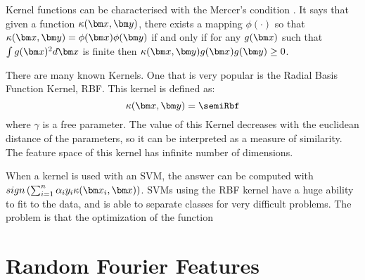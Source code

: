 \begin{pre-delivery}
Kernel functions can be characterised with the Mercer's condition
\cite{mercer1909functions}. It says that given a function $\kernel(\vx, \vy)$,
there exists a mapping $\phi(\cdot)$ so that
$\kernel(\vx, \vy) = \phi(\vx)\phi(\vy)$
if and only if for any $g(\vx)$ such that $\int g(\vx)^2 d\vx$ is finite then
$\kernel(\vx, \vy)g(\vx)g(\vy) \geq 0$.

There are many known Kernels. One that is very popular is the Radial Basis
Function Kernel, RBF. This kernel is defined as:
\begin{equation}
\kernel(\vx,\vy) = \semiRbf
\end{equation}
where $\gamma$ is a free parameter. The value of this Kernel decreases with the
euclidean distance of the parameters, so it can be interpreted as a measure
of similarity. The feature space of this kernel has infinite number of
dimensions.

When a kernel is used with an SVM, the answer can be computed with
$sign\left(\sum_{i = 1}^n \alpha_iy_i\kernel(\vx_i, \vx)\right)$.
SVMs using the RBF kernel have a huge ability to fit to the data, and is able
to separate classes for very difficult problems. The problem is that the
optimization of the function 

\end{pre-delivery}

\section{Random Fourier Features}
\section{\Nys}
